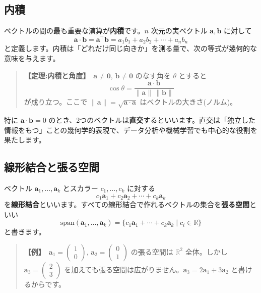 \documentclass{article}
\begin{document}
\subsection{内積}

ベクトルの間の最も重要な演算が\textbf{内積}です。\(n\) 次元の実ベクトル \(\boldsymbol{a}, \boldsymbol{b}\) に対して
\[ \boldsymbol{a} \cdot \boldsymbol{b} = \boldsymbol{a}^{\top} \boldsymbol{b} = a_1 b_1 + a_2 b_2 + \cdots + a_n b_n \]
と定義します。内積は「どれだけ同じ向きか」を測る量で、次の等式が幾何的な意味を与えます。

\begin{quote}
\textbf{【定理:内積と角度】}\ \(\boldsymbol{a} \neq \boldsymbol{0}\), \(\boldsymbol{b} \neq \boldsymbol{0}\) のなす角を \(\theta\) とすると
\[ \cos\theta = \frac{\boldsymbol{a} \cdot \boldsymbol{b}}{\|\boldsymbol{a}\|\, \|\boldsymbol{b}\|} \]
が成り立つ。ここで \(\|\boldsymbol{a}\| = \sqrt{\boldsymbol{a} \cdot \boldsymbol{a}}\) はベクトルの大きさ(ノルム)。
\end{quote}

特に \(\boldsymbol{a} \cdot \boldsymbol{b} = 0\) のとき、2つのベクトルは\textbf{直交}するといいます。直交は「独立した情報をもつ」ことの幾何学的表現で、データ分析や機械学習でも中心的な役割を果たします。

\subsection{線形結合と張る空間}

ベクトル \(\boldsymbol{a}_1, \dots, \boldsymbol{a}_k\) とスカラー \(c_1, \dots, c_k\) に対する
\[ c_1 \boldsymbol{a}_1 + c_2 \boldsymbol{a}_2 + \cdots + c_k \boldsymbol{a}_k \]
を\textbf{線形結合}といいます。すべての線形結合で作れるベクトルの集合を\textbf{張る空間}といい
\[ \mathrm{span}(\boldsymbol{a}_1, \dots, \boldsymbol{a}_k) = \{ c_1 \boldsymbol{a}_1 + \cdots + c_k \boldsymbol{a}_k \mid c_i \in \mathbb{R} \} \]
と書きます。

\begin{quote}
\textbf{【例】}\ \(\boldsymbol{a}_1 = \begin{pmatrix} 1 \\ 0 \end{pmatrix}\), \(\boldsymbol{a}_2 = \begin{pmatrix} 0 \\ 1 \end{pmatrix}\) の張る空間は \(\mathbb{R}^2\) 全体。しかし \(\boldsymbol{a}_3 = \begin{pmatrix} 2 \\ 3 \end{pmatrix}\) を加えても張る空間は広がりません。\(\boldsymbol{a}_3 = 2\boldsymbol{a}_1 + 3\boldsymbol{a}_2\) と書けるからです。
\end{quote}
\end{document}
